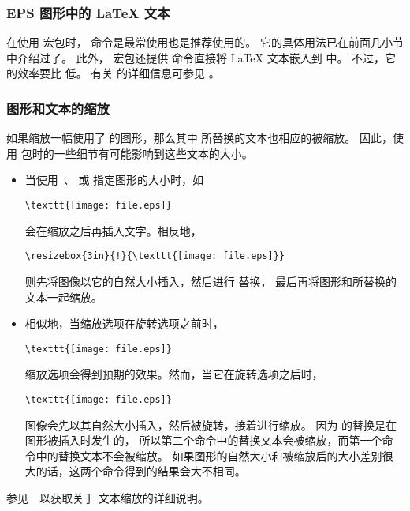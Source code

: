 \subsubsection{EPS 图形中的 \LaTeX{} 文本}\label{sssec:latextext}

在使用  宏包时， 命令是最常使用也是推荐使用的。
它的具体用法已在前面几小节中介绍过了。
此外， 宏包还提供  命令直接将 \LaTeX{} 文本嵌入到  中。
不过，它的效率要比  低。
有关  的详细信息可参见 \cite{psfrag-doc}。

\subsubsection{图形和文本的缩放}\label{sssec:psfragscale}

如果缩放一幅使用了  的图形，那么其中  所替换的文本也相应的被缩放。
因此，使用  包时的一些细节有可能影响到这些文本的大小。

\begin{itemize}
\item 当使用~、 或  指定图形的大小时，如
\begin{lstlisting}
\texttt{[image: file.eps]}
\end{lstlisting}
       会在缩放之后再插入文字。相反地，
\begin{lstlisting}
\resizebox{3in}{!}{\texttt{[image: file.eps]}}
\end{lstlisting}
      则先将图像以它的自然大小插入，然后进行 替换，
      最后再将图形和所替换的文本一起缩放。
      
\item 相似地，当缩放选项在旋转选项之前时，
\begin{lstlisting}
\texttt{[image: file.eps]}
\end{lstlisting}
      缩放选项会得到预期的效果。然而，当它在旋转选项之后时，
\begin{lstlisting}
\texttt{[image: file.eps]}
\end{lstlisting}
      图像会先以其自然大小插入，然后被旋转，接着进行缩放。
      因为  的替换是在图形被插入时发生的，
      所以第二个命令中的替换文本会被缩放，而第一个命令中的替换文本不会被缩放。
      如果图形的自然大小和被缩放后的大小差别很大的话，这两个命令得到的结果会大不相同。
\end{itemize}
参见~\cite{psfrag-doc}~以获取关于  文本缩放的详细说明。

